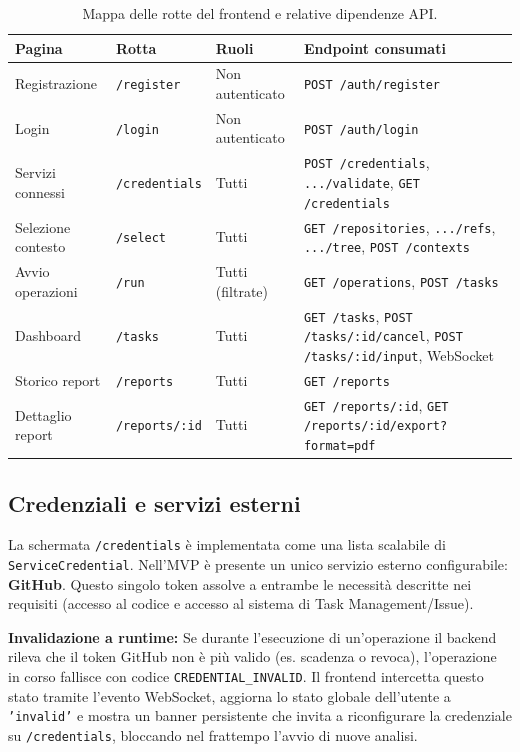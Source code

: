 \documentclass[11pt,a4paper]{article}
\begin{document}
\begin{table}[H]
\centering
\caption{Mappa delle rotte del frontend e relative dipendenze API.}
\label{tab:fe-rotte}
\vspace{2mm}
\renewcommand{\arraystretch}{1.2}
\begin{tabularx}{\textwidth}{|l|l|l|X|}
\hline
\textbf{Pagina} & \textbf{Rotta} & \textbf{Ruoli} & \textbf{Endpoint consumati} \\ \hline
Registrazione & \texttt{/register} & Non autenticato & \texttt{POST /auth/register} \\ \hline
Login & \texttt{/login} & Non autenticato & \texttt{POST /auth/login} \\ \hline
Servizi connessi & \texttt{/credentials} & Tutti & \texttt{POST /credentials}, \texttt{.../validate}, \texttt{GET /credentials} \\ \hline
Selezione contesto & \texttt{/select} & Tutti & \texttt{GET /repositories}, \texttt{.../refs}, \texttt{.../tree}, \texttt{POST /contexts} \\ \hline
Avvio operazioni & \texttt{/run} & Tutti (filtrate) & \texttt{GET /operations}, \texttt{POST /tasks} \\ \hline
Dashboard & \texttt{/tasks} & Tutti & \texttt{GET /tasks}, \texttt{POST /tasks/:id/cancel}, \texttt{POST /tasks/:id/input}, WebSocket \\ \hline
Storico report & \texttt{/reports} & Tutti & \texttt{GET /reports} \\ \hline
Dettaglio report & \texttt{/reports/:id} & Tutti & \texttt{GET /reports/:id}, \texttt{GET /reports/:id/export?format=pdf} \\ \hline
\end{tabularx}
\end{table}

\subsection{Credenziali e servizi esterni}

La schermata \texttt{/credentials} è implementata come una lista scalabile di \texttt{ServiceCredential}. Nell'MVP è presente un unico servizio esterno configurabile: \textbf{GitHub}. Questo singolo token assolve a entrambe le necessità descritte nei requisiti (accesso al codice e accesso al sistema di Task Management/Issue).

\textbf{Invalidazione a runtime:} Se durante l'esecuzione di un'operazione il backend rileva che il token GitHub non è più valido (es. scadenza o revoca), l'operazione in corso fallisce con codice \texttt{CREDENTIAL\_INVALID}. Il frontend intercetta questo stato tramite l'evento WebSocket, aggiorna lo stato globale dell'utente a \texttt{'invalid'} e mostra un banner persistente che invita a riconfigurare la credenziale su \texttt{/credentials}, bloccando nel frattempo l'avvio di nuove analisi.
\end{document}
